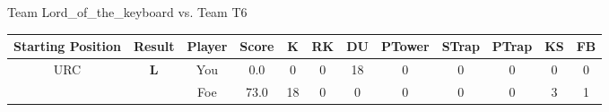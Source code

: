 \documentclass[a4paper,12pt]{article}
\begin{document}
\begin{tabular}[t]{| c | c | c | c | c | c | c | c | c | c | c | c
      |}
                      
      
                      
      
                      
      
                      
      
                      
                        \hline
                      \end{tabular}
                      
  \vspace*{2em}
  \par {\large {\color{Gray} Team} Lord\_of\_the\_keyboard {\color{Gray}
      vs. Team} T6}
  \newline
  \begin{tabular}[t]{| c | c | c | c | c | c | c | c | c | c | c | c
      |}
    \hline
    Starting Position & \textbf{Result} & Player & \textbf{Score} & K & RK & DU & PTower & STrap & PTrap & KS & FB \\
    
      
        \hline
        \multirow{2}{*}{  URC
             } &
              \multirow{2}{*}{  \textbf{L}  } & 
                    \cellcolor{yellow!25} You & \cellcolor{yellow!25} 0.0 & \cellcolor{yellow!25} 0 &
                    \cellcolor{yellow!25} 0 & \cellcolor{yellow!25} 18 & \cellcolor{yellow!25} 0 &
                    \cellcolor{yellow!25} 0 & \cellcolor{yellow!25} 0 & \cellcolor{yellow!25} 0 &
                    \cellcolor{yellow!25} 0 \\
                    \cline{3-12}
                    & & \cellcolor{red!15} Foe & \cellcolor{red!15} 73.0 & \cellcolor{red!15} 18 & \cellcolor{red!15}
                    0 & \cellcolor{red!15} 0
                    & \cellcolor{red!15} 0 & \cellcolor{red!15}
                    0 & \cellcolor{red!15} 0 
                    & \cellcolor{red!15} 3 & \cellcolor{red!15}
                    1 \\
                    
                      
      
                      
      
                      
      
                      
      
                      
      
                      
      
                      
      

\end{tabular}
\end{document}
